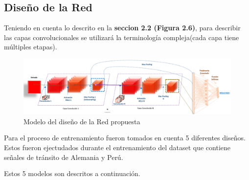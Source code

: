 	\subsection{Diseño de la Red}
	
	Teniendo en cuenta lo descrito en la {\bf seccion 2.2 (Figura 2.6)}, para describir las capas convolucionales se utilizará la terminología compleja(cada capa tiene múltiples etapas).
	
		\begin{figure}[H]
		\includegraphics[width=1\textwidth]{images/desarrollo/networkArquitec/designNet}
		\begin{center}
		\caption{\small{Modelo del diseño de la Red propuesta}}
		{\small{\fontsize{10}{16.8}\selectfont {Fuente: Elaboración propia}}}
		\end{center}
		\vspace{-1.5em}
		\end{figure}

	Para el proceso de entrenamiento fueron tomados en cuenta 5 diferentes diseños. Estos fueron ejectudados durante el entrenamiento del dataset que contiene señales de tránsito de Alemania y Perú.

	Estos 5 modelos son descritos a continuación.
		\newpage
